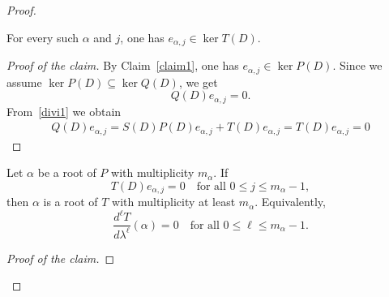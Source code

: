 ﻿\documentclass[12pt]{article}
\begin{document}
\begin{proof}
\begin{claim}
For every such $\alpha$ and $j$, one has $e_{\alpha, j} \in \ker T(D)$.
\end{claim} 
\begin{proof}[Proof of the claim]
By Claim~\ref{claim1}, one has $e_{\alpha, j} \in \ker P(D)$. Since we assume $\ker P(D) \subseteq \ker Q(D)$, we get
\[
 Q(D)e_{\alpha, j} = 0.
\]
From~\eqref{divi1} we obtain
\[
\begin{aligned}
 Q(D)e_{\alpha, j} = S(D)P(D)e_{\alpha, j} + T(D)e_{\alpha, j} = T(D)e_{\alpha, j} = 0
\end{aligned}
\]
\end{proof}
\begin{claim}\label{factorroot}
Let $\alpha$ be a root of $P$ with multiplicity $m_\alpha$.
If
\begin{equation}\label{assump1}
 T(D)e_{\alpha, j} = 0
 \quad
 \text{for all }0\le j\le m_\alpha - 1,
\end{equation}
then $\alpha$ is a root of $T$ with multiplicity at least $m_\alpha$. Equivalently,
\[
 \frac{d^\ell T}{d\lambda^\ell}(\alpha) = 0
 \quad
 \text{for all }0\le \ell\le m_\alpha - 1.
\]
\end{claim}
\begin{proof}[Proof of the claim]


\end{proof}
\end{proof}
\end{document}
